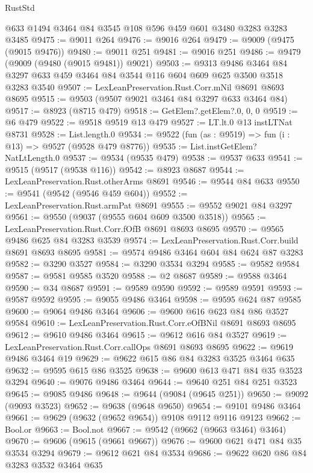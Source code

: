 \begin{lexlean}{RustStd}
\begin{coremodule}
    @633
    @1494
    @3464
    @84
    @3545
    @108
    @596
    @459
    @601
    @3480
    @3283
    @3283
    @3485
@9475 := @9011 @264
@9476 := @9016 @264
@9479 := @9009 (@9475 (@9015 @9476))
@9480 := @9011 @251
@9481 := @9016 @251
@9486 := @9479 (@9009 (@9480 (@9015 @9481)) @9021)
@9503 := @9313
    @9486
    @3464
    @84
    @3297
    @633
    @459
    @3464
    @84
    @3544
    @116
    @604
    @609
    @625
    @3500
    @3518
    @3283
    @3540
@9507 := LexLeanPreservation.Rust.Corr.mNil @8691 @8693 @8695
@9515 := @9503 (@9507 @9021 @3464 @84 @3297 @633 @3464 @84)
@9517 := @8923 (@8715 @479)
@9518 := GetElem?.getElem?.{0, 0, 0}
@9519 := @6 @479
@9522 := @9518 @9519 @13 @479
@9527 := LT.lt.{0} @13 instLTNat @8731
@9528 := List.length.{0}
@9534 := @9522 (fun (as : @9519) => fun (i : @13) => @9527 (@9528 @479 @8776))
@9535 := List.instGetElem?NatLtLength.{0}
@9537 := @9534 (@9535 @479)
@9538 := @9537 @633
@9541 := @9515 (@9517 (@9538 @116))
@9542 := @8923 @8687
@9544 := LexLeanPreservation.Rust.otherArms @8691
@9546 := @9544 @84 @633
@9550 := @9541 (@9542 (@9546 @459 @604))
@9552 := LexLeanPreservation.Rust.armPat @8691
@9555 := @9552 @9021 @84 @3297
@9561 := @9550 (@9037 (@9555 @604 @609 @3500 @3518))
@9565 := LexLeanPreservation.Rust.Corr.fOfB @8691 @8693 @8695
@9570 := @9565 @9486 @625 @84 @3283 @3539
@9574 := LexLeanPreservation.Rust.Corr.build @8691 @8693 @8695
@9581 := @9574 @9486 @3464 @604 @84 @624 @87 @3283
@9582 := @3290 @3527
@9584 := @3290 @3534 @3294
@9585 := @9582 @9584
@9587 := @9581 @9585 @3520
@9588 := @2 @8687
@9589 := @9588 @3464
@9590 := @34 @8687
@9591 := @9589 @9590
@9592 := @9589 @9591
@9593 := @9587 @9592
@9595 := @9055 @9486 @3464
@9598 := @9595 @624 @87 @9585
@9600 := @9064 @9486 @3464
@9606 := @9600 @616 @623 @84 @86 @3527 @9584
@9610 := LexLeanPreservation.Rust.Corr.eOfBNil @8691 @8693 @8695
@9612 := @9610 @9486 @3464
@9615 := @9612 @616 @84 @3527
@9619 := LexLeanPreservation.Rust.Corr.callOps @8691 @8693 @8695
@9622 := @9619 @9486 @3464 @19
@9629 := @9622 @615 @86 @84 @3283 @3525 @3464 @635
@9632 := @9595 @615 @86 @3525
@9638 := @9600 @613 @471 @84 @35 @3523 @3294
@9640 := @9076 @9486 @3464
@9644 := @9640 @251 @84 @251 @3523
@9645 := @9085 @9486
@9648 := @9644 (@9084 (@9645 @251))
@9650 := @9092 (@9093 @3523)
@9652 := @9638 (@9648 @9650)
@9654 := @9101 @9486 @3464
@9661 := @9629 (@9632 (@9652 @9654)) @9108 @9112 @9116 @9123
@9662 := Bool.or
@9663 := Bool.not
@9667 := @9542 (@9662 (@9663 @3464) @3464)
@9670 := @9606 (@9615 (@9661 @9667))
@9676 := @9600 @621 @471 @84 @35 @3534 @3294
@9679 := @9612 @621 @84 @3534
@9686 := @9622 @620 @86 @84 @3283 @3532 @3464 @635

\end{coremodule}
\end{lexlean}
